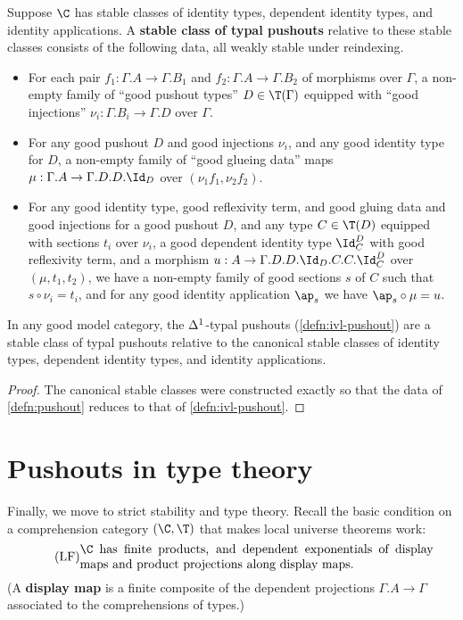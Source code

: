 \begin{defn}\label{defn:pushout}
  Suppose $\C$ has stable classes of identity types, dependent identity types, and identity applications.
  A \textbf{stable class of typal pushouts} relative to these stable classes consists of the following data, all weakly stable under reindexing.
  \begin{itemize}
  \item For each pair $f_1:\Gamma.A\to \Gamma.B_1$ and $f_2:\Gamma.A\to \Gamma.B_2$ of morphisms over $\Gamma$, a non-empty family of ``good pushout types'' $D\in\T(\Gamma)$ equipped with ``good injections'' $\nu_i : \Gamma.B_i \to \Gamma.D$ over $\Gamma$.
  \item For any good pushout $D$ and good injections $\nu_i$, and any good identity type for $D$, a non-empty family of ``good glueing data'' maps $\mu : \Gamma.A \to \Gamma.D.D.\Id_D$ over $(\nu_1 f_1,\nu_2 f_2)$.
  \item For any good identity type, good reflexivity term, and good gluing data and good injections for a good pushout $D$, and any type $C\in\T(D)$ equipped with sections $t_i$ over $\nu_i$, a good dependent identity type $\Id^D_C$ with good reflexivity term, and a morphism $u:A\to \Gamma.D.D.\Id_D.C.C.\Id^D_C$ over $(\mu,t_1,t_2)$, we have a non-empty family of good sections $s$ of $C$ such that $s \circ \nu_i = t_i$, and for any good identity application $\ap_s$ we have $\ap_s \circ \mu = u$.
  \end{itemize}
\end{defn}

\begin{thm}\label{thm:model-pushout}
  In any good model category, the ${\Delta^1}$-typal pushouts (\cref{defn:ivl-pushout}) are a stable class of typal pushouts relative to the canonical stable classes of identity types, dependent identity types, and identity applications.
\end{thm}
\begin{proof}
  The canonical stable classes were constructed exactly so that the data of \cref{defn:pushout} reduces to that of \cref{defn:ivl-pushout}.
\end{proof}


\section{Pushouts in type theory}
\label{sec:pushouts-type-theory}

Finally, we move to strict stability and type theory.
Recall the basic condition on a comprehension category $(\C,\T)$ that makes local universe theorems work:
\begin{equation}
  \label{eq:lf}
  \tag{LF} \parbox{10cm}{$\C$ has finite products, and dependent exponentials of display maps and product projections along display maps.}
\end{equation}
(A \textbf{display map} is a finite composite of the dependent projections $\Gamma.A\to\Gamma$ associated to the comprehensions of types.)

